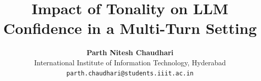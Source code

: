 \usepackage[final]{acl}
\usepackage{times}
\usepackage{latexsym}
\usepackage[T1]{fontenc}
\usepackage[utf8]{inputenc}
\usepackage{microtype}
\usepackage{inconsolata}
\usepackage{graphicx}
\usepackage{booktabs}
\usepackage{amsmath}
\usepackage{amssymb}
\usepackage{xspace}
\usepackage{adjustbox}
\usepackage{float}

\newcommand{\Valid}{\textsc{Valid}\xspace}
\newcommand{\Invalid}{\textsc{Invalid}\xspace}
\newcommand{\ind}{\mathbf{1}}

\title{Impact of Tonality on LLM Confidence in a Multi-Turn Setting}

\author{
  \textbf{Parth Nitesh Chaudhari} \\
  International Institute of Information Technology, Hyderabad \\
  \texttt{parth.chaudhari@students.iiit.ac.in}
}
